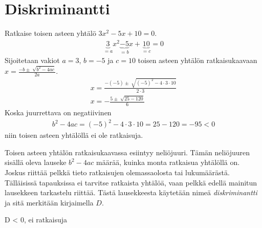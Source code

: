 \section{Diskriminantti}

\begin{esimerkki}
    Ratkaise toisen asteen yhtälö $3x^2-5x+10=0$.
    \begin{align*}
        \underbrace{3}_{=a}x^2\underbrace{-5}_{=b}x+\underbrace{10}_{=c}=0
    \end{align*}
    Sijoitetaan vakiot $a=3$, $b=-5$ ja $c=10$ toisen asteen yhtälön ratkaisukaavaan $x=\frac{-b \pm \sqrt[]{b^2-4ac}}{2a}$.
    \begin{align*}
        x=\frac{-(-5) \pm \sqrt[]{(-5)^2-4\cdot 3 \cdot 10}}{2 \cdot 3} \\
        x=-\frac{5 \pm \sqrt[]{25-120}}{6}
    \end{align*}
    Koska juurrettava on negatiivinen
    \begin{align*}
        b^2-4ac=(-5)^2-4 \cdot 3 \cdot 10=25-120=-95<0
    \end{align*}
    niin toisen asteen yhtälöllä ei ole ratkaisuja.
\end{esimerkki}


Toisen asteen yhtälön ratkaisukaavassa esiintyy neliöjuuri. Tämän neliöjuuren sisällä oleva lauseke $b^2-4ac$ määrää, kuinka monta ratkaisua yhtälöllä on. Joskus riittää pelkkä tieto ratkaisujen olemassaolosta tai lukumäärästä. Tälläisissä tapauksissa ei tarvitse ratkaista yhtälöä, vaan pelkkä edellä mainitun lausekkeen tarkastelu riittää. Tästä lausekkeesta käytetään nimeä \emph{diskriminantti} ja sitä merkitään kirjaimella $D$.


D < 0, ei ratkaisuja
\begin{kuvaajapohja}{1}{-1}{3}{-1}{3}
\end{kuvaajapohja}

